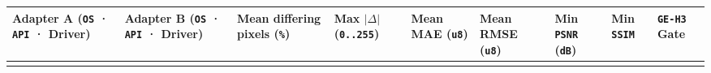 \documentclass[10pt,letterpaper]{article}
\begin{document}
{\scriptsize\setlength{\tabcolsep}{2.4pt}\renewcommand{\arraystretch}{1.12}
\begin{longtable}[]{@{}
  >{\raggedright\arraybackslash}p{}
  >{\raggedright\arraybackslash}p{}
  >{\raggedleft\arraybackslash}p{}
  >{\raggedleft\arraybackslash}p{}
  >{\raggedleft\arraybackslash}p{}
  >{\raggedleft\arraybackslash}p{}
  >{\raggedleft\arraybackslash}p{}
  >{\raggedleft\arraybackslash}p{}
  >{\centering\arraybackslash}p{}@{}}
\toprule\noalign{}
\begin{minipage}[b]{\linewidth}\raggedright
\textbf{Adapter A (\texttt{OS} · \texttt{API} · Driver)}
\end{minipage} & \begin{minipage}[b]{\linewidth}\raggedright
\textbf{Adapter B (\texttt{OS} · \texttt{API} · Driver)}
\end{minipage} & \begin{minipage}[b]{\linewidth}\raggedleft
\textbf{Mean differing pixels (\texttt{\%})}
\end{minipage} & \begin{minipage}[b]{\linewidth}\raggedleft
\textbf{Max \(\lvert \Delta \rvert\) (\texttt{0..255})}
\end{minipage} & \begin{minipage}[b]{\linewidth}\raggedleft
\textbf{Mean MAE (\texttt{u8})}
\end{minipage} & \begin{minipage}[b]{\linewidth}\raggedleft
\textbf{Mean RMSE (\texttt{u8})}
\end{minipage} & \begin{minipage}[b]{\linewidth}\raggedleft
\textbf{Min \texttt{PSNR} (\texttt{dB})}
\end{minipage} & \begin{minipage}[b]{\linewidth}\raggedleft
\textbf{Min \texttt{SSIM}}
\end{minipage} & \begin{minipage}[b]{\linewidth}\centering
\textbf{\texttt{GE-H3} Gate}
\end{minipage} \\
\midrule\noalign{}
\endhead
\bottomrule\noalign{}
\endlastfoot

\end{longtable}}
\end{document}
